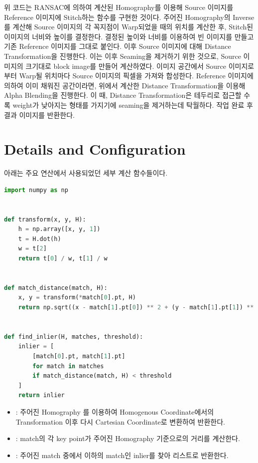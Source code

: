 \documentclass{report}
\begin{document}
위 코드는 RANSAC에 의하여 계산된 Homography를 이용해 Source 이미지를 Reference 이미지에 Stitch하는 함수를 구현한 것이다.
주어진 Homography의 Inverse를 계산해 Source 이미지의 각 꼭지점이 Warp되었을 때의 위치를 계산한 후, Stitch된 이미지의 너비와 높이를 결정한다.
결정된 높이와 너비를 이용하여 빈 이미지를 만들고 기존 Reference 이미지를 그대로 붙인다.
이후 Source 이미지에 대해 Distance Transformation을 진행한다.
이는 이후 Seaming을 제거하기 위한 것으로, Source 이미지의 크기대로 block image를 만들어 계산하였다.
이미지 공간에서 Source 이미지로부터 Warp될 위치마다 Source 이미지의 픽셀을 가져와 합성한다.
Reference 이미지에 의하여 이미 채워진 공간이라면, 위에서 계산한 Distance Transformation을 이용해 Alpha Blending을 진행한다.
이 때, Distance Transformation은 테두리로 접근할 수록 weight가 낮아지는 형태를 가지기에 seaming을 제거하는데 탁월하다.
작업 완료 후 결과 이미지를 반환한다.

\newpage

\section*{Details and Configuration}

아래는 주요 연산에서 사용되었던 세부 계산 함수들이다.

\begin{lstlisting}[language=Python, caption=util.py, firstnumber=1]
import numpy as np


def transform(x, y, H):
    h = np.array([x, y, 1])
    t = H.dot(h)
    w = t[2]
    return t[0] / w, t[1] / w


def match_distance(match, H):
    x, y = transform(*match[0].pt, H)
    return np.sqrt((x - match[1].pt[0]) ** 2 + (y - match[1].pt[1]) ** 2)


def find_inlier(H, matches, threshold):
    inlier = [
        [match[0].pt, match[1].pt]
        for match in matches
        if match_distance(match, H) < threshold
    ]
    return inlier
\end{lstlisting}

\begin{itemize}
    \item {}: 주어진 Homography 를 이용하여 Homogenous Coordinate에서의 Transformation 이후 다시 Cartesian Coordinate로 변환하여 반환한다.
    \item {}: match의 각 key point가 주어진 Homography  기준으로의 거리를 계산한다.
    \item {}: 주어진 match 중에서  이하의 match인 inlier를 찾아 리스트로 반환한다.
\end{itemize}
\end{document}
